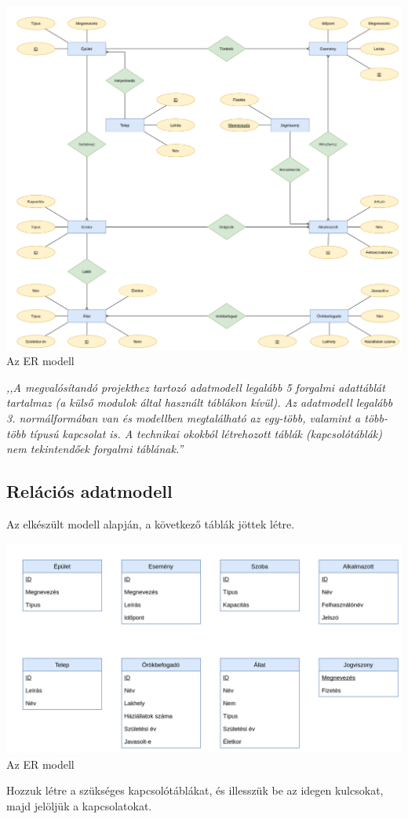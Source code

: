 \documentclass[a4paper,12pt]{article}
\begin{document}
\begin{center}
	\includegraphics[width = 17cm]{"SQL_tervezés.png"} \\
	{\small Az ER modell}
\end{center}

\begin{center}
	\textit{{\small ,,A megvalósítandó projekthez tartozó adatmodell legalább 5 forgalmi adattáblát tartalmaz (a külső modulok által használt táblákon kívül). Az adatmodell legalább 3. normálformában van és modellben megtalálható az egy-több, valamint a több-több típusú kapcsolat is. A technikai okokból létrehozott táblák (kapcsolótáblák) nem tekintendőek forgalmi táblának.''}}
\end{center}
\newpage
\subsection{Relációs adatmodell}
Az elkészült modell alapján, a következő táblák jöttek létre.
\begin{center}
	\includegraphics[width = 15cm]{"SQL_Táblák.png"} \\
	{\small Az ER modell}
\end{center}
Hozzuk létre a szükséges kapcsolótáblákat, és illesszük be az idegen kulcsokat, majd jelöljük a kapcsolatokat.
\end{document}
